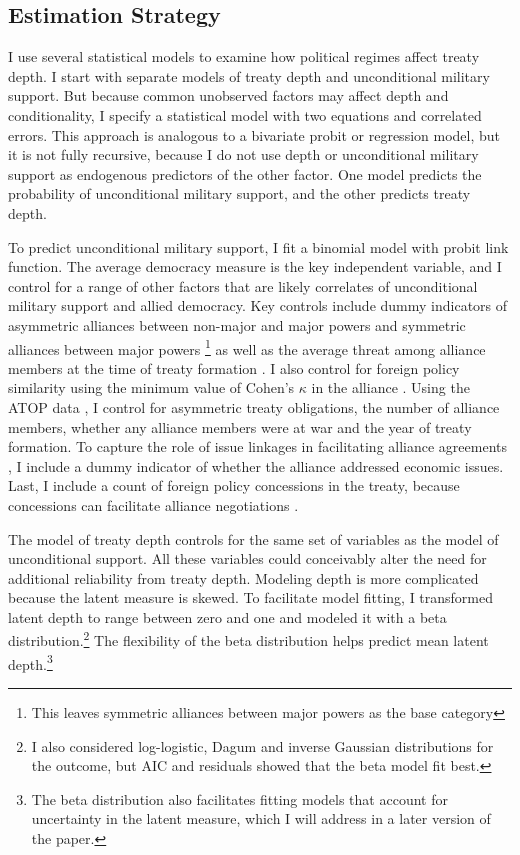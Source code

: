 \documentclass[12pt]{article}
\begin{document}
\subsection{Estimation Strategy}

I use several statistical models to examine how political regimes affect treaty depth. 
I start with separate models of treaty depth and unconditional military support. 
But because common unobserved factors may affect depth and conditionality, I specify a statistical model with two equations and correlated errors.
This approach is analogous to a bivariate probit or regression model, but it is not fully recursive, because I do not use depth or unconditional military support as endogenous predictors of the other factor. 
One model predicts the probability of unconditional military support, and the other predicts treaty depth.


To predict unconditional military support, I fit a binomial model with probit link function. 
The average democracy measure is the key independent variable, and I control for a range of other factors that are likely correlates of unconditional military support and allied democracy. 
Key controls include dummy indicators of asymmetric alliances between non-major and major powers and symmetric alliances between major powers \citep{Mattes2012}\footnote{This leaves symmetric alliances between major powers as the base category} as well as the average threat among alliance members at the time of treaty formation \citep{LeedsSavun2007}. 
I also control for foreign policy similarity \citep{Benson2012} using the minimum value of Cohen's $\kappa$ in the alliance \citep{Hage2011}.
Using the ATOP data \citep{Leedsetal2002}, I control for asymmetric treaty obligations, the number of alliance members, whether any alliance members were at war and the year of treaty formation. 
To capture the role of issue linkages in facilitating alliance agreements \citep{Poast2012, Poast2013}, I include a dummy indicator of whether the alliance addressed economic issues.  
Last, I include a count of foreign policy concessions in the treaty, because concessions can facilitate alliance negotiations \citep{Johnson2015}. 


The model of treaty depth controls for the same set of variables as the model of unconditional support. 
All these variables could conceivably alter the need for additional reliability from treaty depth. 
Modeling depth is more complicated because the latent measure is skewed.
To facilitate model fitting, I transformed latent depth to range between zero and one and modeled it with a beta distribution.\footnote{I also considered log-logistic, Dagum and inverse Gaussian distributions for the outcome, but AIC and residuals showed that the beta model fit best.}
The flexibility of the beta distribution helps predict mean latent depth.\footnote{The beta distribution also facilitates fitting models that account for uncertainty in the latent measure, which I will address in a later version of the paper.} 
\end{document}
